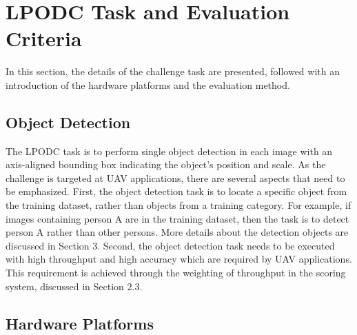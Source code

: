 \documentclass[10pt,journal,compsoc]{IEEEtran}
\begin{document}


\section{LPODC Task and Evaluation Criteria}
In this section, the details of the challenge task are presented, followed with an introduction of the hardware platforms and the evaluation method.

\subsection{Object Detection}
The LPODC task is to perform single object detection in each image with an axis-aligned bounding box indicating the object's position and scale.
As the challenge is targeted at UAV applications, there are several aspects that need to be emphasized.
First, the object detection task is to locate a specific object from the training dataset, rather than objects from a training category.
For example, if images containing person A are in the training dataset, then the task is to detect person A rather than other persons.
More details about the detection objects are discussed in Section 3.
Second, the object detection task needs to be executed with high throughput and high accuracy which are required by UAV applications.
This requirement is achieved through the weighting of throughput in the scoring system, discussed in Section 2.3.


\subsection{Hardware Platforms}
\end{document}
